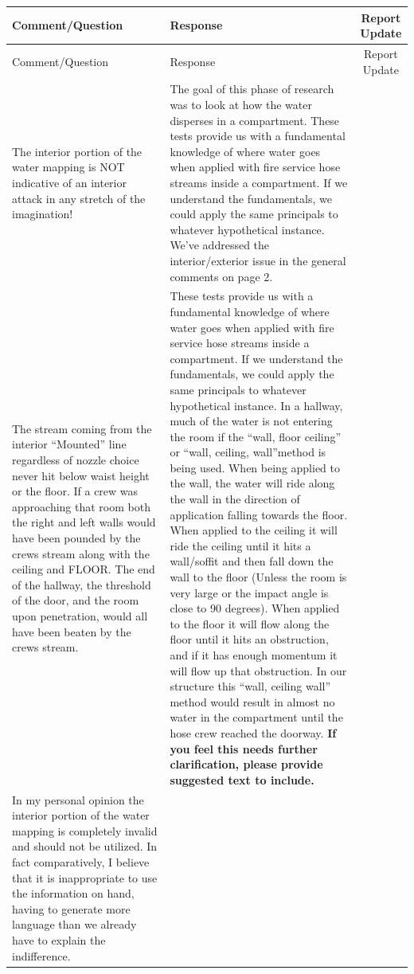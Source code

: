 \documentclass[12pt,oneside]{book}
\begin{document}
\begin{landscape}
\begin{longtable}{|L{4in}|L{3.75in}|c|}
		\hline
		Comment/Question & Response & Report Update \\ 
		\toprule[1.0pt] \endfirsthead
		\hline
		Comment/Question & Response & Report Update \\ 
		\toprule[1.0pt] \endhead
		\hline
		The interior portion of the water mapping is NOT indicative of an interior attack in any stretch of the imagination! & 
		The goal of this phase of research was to look at how the water disperses in a compartment. These tests provide us with a fundamental knowledge of where water goes when applied with fire service hose streams inside a compartment. If we understand the fundamentals, we could apply the same principals to whatever hypothetical instance. We've addressed the interior/exterior issue in the general comments on page 2. & \checkmark \\
		\hline
		The stream coming from the interior “Mounted” line regardless of nozzle choice never hit below waist height or the floor. If a crew was approaching that room both the right and left walls would have been pounded by the crews stream along with the ceiling and FLOOR. The end of the hallway, the threshold of the door, and the room upon penetration, would all have been beaten by the crews stream. &
		These tests provide us with a fundamental knowledge of where water goes when applied with fire service hose streams inside a compartment. If we understand the fundamentals, we could apply the same principals to whatever hypothetical instance. In a hallway, much of the water is not entering the room if the ``wall, floor ceiling'' or ``wall, ceiling, wall''method is being used. When being applied to the wall, the water will ride along the wall in the direction of application falling towards the floor. When applied to the ceiling it will ride the ceiling until it hits a wall/soffit and then fall down the wall to the floor (Unless the room is very large or the impact angle is close to 90 degrees). When applied to the floor it will flow along the floor until it hits an obstruction, and if it has enough momentum it will flow up that obstruction. In our structure this ``wall, ceiling wall'' method would result in almost no water in the compartment until the hose crew reached the doorway.  \textbf{If you feel this needs further clarification, please provide suggested text to include.} & \\
		\hline
		In my personal opinion the interior portion of the water mapping is completely invalid and should not be utilized. In fact comparatively, I believe that it is inappropriate to use the information on hand, having to generate more language than we already have to explain the indifference. &

\end{longtable}
\end{landscape}
\end{document}
